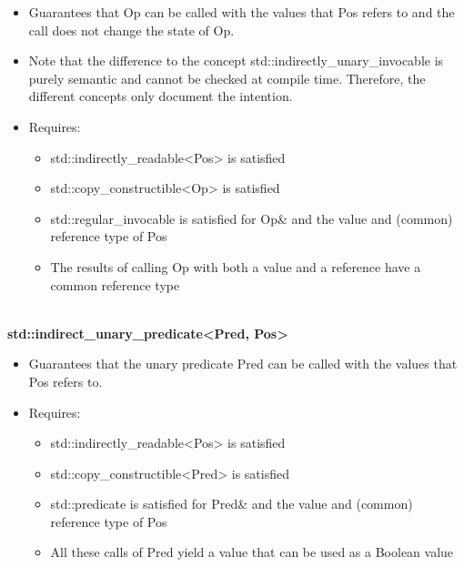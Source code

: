 \begin{itemize}
\item
Guarantees that Op can be called with the values that Pos refers to and the call does not change the state of Op.

\item
Note that the difference to the concept std::indirectly\_unary\_invocable is purely semantic and cannot be checked at compile time. Therefore, the different concepts only document the intention.

\item
Requires:
\begin{itemize}
\item
std::indirectly\_readable<Pos> is satisfied

\item
std::copy\_constructible<Op> is satisfied

\item
std::regular\_invocable is satisfied for Op\& and the value and (common) reference type of Pos

\item
The results of calling Op with both a value and a reference have a common reference type
\end{itemize}
\end{itemize}


\noindent
\hspace*{\fill} \\ %
\textbf{std::indirect\_unary\_predicate<Pred, Pos>}

\begin{itemize}
\item
Guarantees that the unary predicate Pred can be called with the values that Pos refers to.

\item
Requires:
\begin{itemize}
\item
std::indirectly\_readable<Pos> is satisfied

\item
std::copy\_constructible<Pred> is satisfied

\item
std::predicate is satisfied for Pred\& and the value and (common) reference type of Pos

\item
All these calls of Pred yield a value that can be used as a Boolean value
\end{itemize}
\end{itemize}


